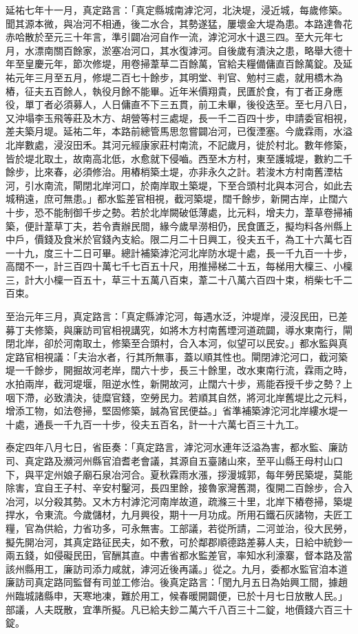 \begin{pinyinscope}
 延祐七年十一月，真定路言：「真定縣城南滹沱河，北決堤，浸近城，每歲修築。聞其源本微，與冶河不相通，後二水合，其勢遂猛，屢壞金大堤為患。本路達魯花赤哈散於至元三十年言，準引闢冶河自作一流，滹沱河水十退三四。至大元年七月，水漂南關百餘家，淤塞冶河口，其水復滹河。自後歲有潰決之患，略舉大德十年至皇慶元年，節次修堤，用卷掃葦草二百餘萬，官給夫糧備傭直百餘萬錠。及延祐元年三月至五月，修堤二百七十餘步，其明堂、判官、勉村三處，就用橋木為樁，征夫五百餘人，執役月餘不能畢。近年米價翔貴，民匱於食，有丁者正身應役，單丁者必須募人，人日傭直不下三五貫，前工未畢，後役迭至。至七月八日，又沖塌李玉飛等莊及木方、胡營等村三處堤，長一千二百四十步，申請委官相視，差夫築月堤。延祐二年，本路前總管馬思忽嘗闢冶河，已復湮塞。今歲霖雨，水溢北岸數處，浸沒田禾。其河元經康家莊村南流，不記歲月，徙於村北。數年修築，皆於堤北取土，故南高北低，水愈就下侵嚙。西至木方村，東至護城堤，數約二千餘步，比來春，必須修治。用樁梢築土堤，亦非永久之計。若浚木方村南舊湮枯河，引水南流，閘閉北岸河口，於南岸取土築堤，下至合頭村北與本河合，如此去城稍遠，庶可無患。」都水監差官相視，截河築堤，闊千餘步，新開古岸，止闊六十步，恐不能制御千步之勢。若於北岸闕破低薄處，比元料，增夫力，葦草卷掃補築，便計葦草丁夫，若令責辦民間，緣今歲旱澇相仍，民食匱乏，擬均料各州縣上中戶，價錢及食米於官錢內支給。限二月二十日興工，役夫五千，為工十六萬七百一十九，度三十二日可畢。總計補築滹沱河北岸防水堤十處，長一千九百一十步，高闊不一，計三百四十萬七千七百五十尺，用推掃梯二十五，每梯用大檁三、小檁三，計大小檁一百五十，草三十五萬八百束，葦二十八萬六百四十束，梢柴七千二百束。



 至治元年三月，真定路言：「真定縣滹沱河，每遇水泛，沖堤岸，浸沒民田，已差募丁夫修築，與廉訪司官相視講究，如將木方村南舊堙河道疏闢，導水東南行，閘閉北岸，卻於河南取土，修築至合頭村，合入本河，似望可以民安。」都水監與真定路官相視議：「夫治水者，行其所無事，蓋以順其性也。閘閉滹沱河口，截河築堤一千餘步，開掘故河老岸，闊六十步，長三十餘里，改水東南行流，霖雨之時，水拍兩岸，截河堤堰，阻逆水性，新開故河，止闊六十步，焉能吞授千步之勢？上咽下滯，必致潰決，徒糜官錢，空勞民力。若順其自然，將河北岸舊堤比之元料，增添工物，如法卷掃，堅固修築，誠為官民便益。」省準補築滹沱河北岸縷水堤一十處，通長一千九百一十步，役夫五百名，計一十六萬七百三十九工。



 泰定四年八月七日，省臣奏：「真定路言，滹沱河水連年泛溢為害，都水監、廉訪司、真定路及瀕河州縣官洎耆老會議，其源自五臺諸山來，至平山縣王母村山口下，與平定州娘子廟石泉冶河合。夏秋霖雨水漲，拶漫城郭，每年勞民築堤，莫能除害，宜自王子村、辛安村鑿河，長四里餘，接魯家灣舊澗，復開二百餘步，合入冶河，以分殺其勢。又木方村滹沱河南岸故道，疏滌三十里，北岸下樁卷掃，築堤捍水，令東流。今歲儲材，九月興役，期十一月功成。所用石鐵石灰諸物，夫匠工糧，官為供給，力省功多，可永無害。工部議，若從所請，二河並治，役大民勞，擬先開冶河，其真定路征民夫，如不敷，可於鄰郡順德路差募人夫，日給中統鈔一兩五錢，如侵礙民田，官酬其直。中書省都水監差官，率知水利濠寨，督本路及當該州縣用工，廉訪司添力咸就，滹河近後再議。」從之。九月，委都水監官洎本道廉訪司真定路同監督有司並工修治。後真定路言：「閏九月五日為始興工間，據趙州臨城諸縣申，天寒地凍，難於用工，候春暖開闢便，已於十月七日放散人民。」部議，人夫既散，宜準所擬。凡已給夫鈔二萬六千八百三十二錠，地價錢六百三十錠。




\end{pinyinscope}

